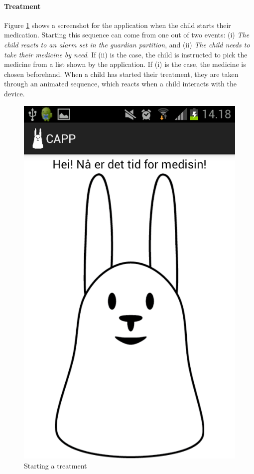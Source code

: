 \paragraph{Treatment}
Figure \ref{fig:capp_start_treatment} shows a screenshot for the application when the child starts their medication. Starting this sequence can come from one out of two events: (i) \emph{The child reacts to an alarm set in the guardian partition}, and (ii) \emph{The child needs to take their medicine by need}. If (ii) is the case, the child is instructed to pick the medicine from a list shown by the application. If (i) is the case, the medicine is chosen beforehand. When a child has started their treatment, they are taken through an animated sequence, which reacts when a child interacts with the device.  


\begin{figure}
		\centering
			\includegraphics[width=0.50\paperwidth]{Pictures/app-screenshots/capp_start_treatment.png}
		\caption{Starting a treatment}
		\label{fig:capp_start_treatment}
\end{figure}

